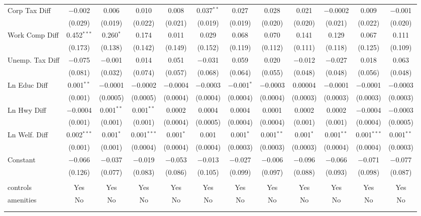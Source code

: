 \begin{table}[!htbp]
\begin{tabular}{@{\extracolsep{5pt}}lccccccccccc}
  Corp Tax Diff & $-$0.002 & 0.006 & 0.010 & 0.008 & 0.037$^{**}$ & 0.027 & 0.028 & 0.021 & $-$0.0002 & 0.009 & $-$0.001 \\ 
  & (0.029) & (0.019) & (0.022) & (0.021) & (0.019) & (0.019) & (0.020) & (0.020) & (0.021) & (0.022) & (0.020) \\ 
  Work Comp Diff & 0.452$^{***}$ & 0.260$^{*}$ & 0.174 & 0.011 & 0.029 & 0.068 & 0.070 & 0.141 & 0.129 & 0.067 & 0.111 \\ 
  & (0.173) & (0.138) & (0.142) & (0.149) & (0.152) & (0.119) & (0.112) & (0.111) & (0.118) & (0.125) & (0.109) \\ 
  Unemp. Tax Diff & $-$0.075 & $-$0.001 & 0.014 & 0.051 & $-$0.031 & 0.059 & 0.020 & $-$0.012 & $-$0.027 & 0.018 & 0.063 \\ 
  & (0.081) & (0.032) & (0.074) & (0.057) & (0.068) & (0.064) & (0.055) & (0.048) & (0.048) & (0.056) & (0.048) \\ 
  Ln Educ Diff & 0.001$^{**}$ & $-$0.0001 & $-$0.0002 & $-$0.0004 & $-$0.0003 & $-$0.001$^{*}$ & $-$0.0003 & 0.00004 & $-$0.0001 & $-$0.0001 & $-$0.0003 \\ 
  & (0.001) & (0.0005) & (0.0005) & (0.0004) & (0.0004) & (0.0004) & (0.0004) & (0.0003) & (0.0003) & (0.0003) & (0.0003) \\ 
  Ln Hwy Diff & $-$0.0004 & 0.001$^{**}$ & 0.001$^{**}$ & 0.0002 & 0.0004 & 0.0004 & 0.0001 & 0.0002 & 0.0002 & $-$0.0004 & $-$0.0003 \\ 
  & (0.001) & (0.001) & (0.001) & (0.0004) & (0.0005) & (0.0004) & (0.0004) & (0.001) & (0.001) & (0.0004) & (0.0005) \\ 
  Ln Welf. Diff & 0.002$^{***}$ & 0.001$^{*}$ & 0.001$^{***}$ & 0.001$^{*}$ & 0.001 & 0.001$^{*}$ & 0.001$^{**}$ & 0.001$^{*}$ & 0.001$^{**}$ & 0.001$^{***}$ & 0.001$^{**}$ \\ 
  & (0.001) & (0.001) & (0.0004) & (0.0004) & (0.0004) & (0.0003) & (0.0003) & (0.0003) & (0.0004) & (0.0004) & (0.0003) \\ 
  Constant & $-$0.066 & $-$0.037 & $-$0.019 & $-$0.053 & $-$0.013 & $-$0.027 & $-$0.006 & $-$0.096 & $-$0.066 & $-$0.071 & $-$0.077 \\ 
  & (0.126) & (0.077) & (0.083) & (0.086) & (0.105) & (0.099) & (0.097) & (0.088) & (0.093) & (0.098) & (0.087) \\ 
 \hline \\[-1.8ex] 
controls & Yes & Yes & Yes & Yes & Yes & Yes & Yes & Yes & Yes & Yes & Yes \\ 
amenities & No & No & No & No & No & No & No & No & No & No & No \\ 
\hline \\[-1.8ex] 
\hline 
\hline \\[-1.8ex] 
\end{tabular} 
\end{table} 
